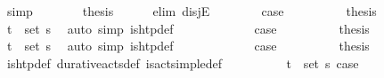 \begin{isabellebody}
\ simp\isanewline
\ \ \ \ \isamarkupfalse%
\ \isamarkupfalse%
\ {\isacharquery}{\kern0pt}thesis\isanewline
\ \ \ \ \isamarkupfalse%
\ {\isacharparenleft}{\kern0pt}elim\ disjE{\isacharparenright}{\kern0pt}\isanewline
\ \ \ \ \ \ \isamarkupfalse%
\ {\isacharquery}{\kern0pt}case{}\isanewline
\ \ \ \ \ \ \isamarkupfalse%
\ \isamarkupfalse%
\ {\isacharquery}{\kern0pt}thesis\isanewline
\ \ \ \ \ \ \ \ \isamarkupfalse%
\ {\isacartoucheopen}{\isacharparenleft}{\kern0pt}t\isactrlsub {\isasympi}{\isacharcomma}{\kern0pt}{\isasympi}{\isacharparenright}{\kern0pt}\ {\isasymin}\ set\ {\isasympi}s{\isacartoucheclose}\ \isamarkupfalse%
\ {\isacharparenleft}{\kern0pt}auto\ simp{\isacharcolon}{\kern0pt}\ is{\isacharunderscore}{\kern0pt}htp{\isacharunderscore}{\kern0pt}def{\isacharparenright}{\kern0pt}\isanewline
\ \ \ \ \isamarkupfalse%
\isanewline
\ \ \ \ \ \ \isamarkupfalse%
\ {\isacharquery}{\kern0pt}case{}\isanewline
\ \ \ \ \ \ \isamarkupfalse%
\ \isamarkupfalse%
\ {\isacharquery}{\kern0pt}thesis\isanewline
\ \ \ \ \ \ \ \ \isamarkupfalse%
\ {\isacartoucheopen}{\isacharparenleft}{\kern0pt}t\isactrlsub {\isasympi}{\isacharcomma}{\kern0pt}{\isasympi}{\isacharparenright}{\kern0pt}\ {\isasymin}\ set\ {\isasympi}s{\isacartoucheclose}\ \isamarkupfalse%
\ {\isacharparenleft}{\kern0pt}auto\ simp{\isacharcolon}{\kern0pt}\ is{\isacharunderscore}{\kern0pt}htp{\isacharunderscore}{\kern0pt}def{\isacharparenright}{\kern0pt}\isanewline
\ \ \ \ \isamarkupfalse%
\isanewline
\ \ \ \ \ \ \isamarkupfalse%
\ {\isacharquery}{\kern0pt}case{}\isanewline
\ \ \ \ \ \ \isamarkupfalse%
\ \isamarkupfalse%
\ {\isacharquery}{\kern0pt}thesis\isanewline
\ \ \ \ \ \ \ \ \isamarkupfalse%
\ is{\isacharunderscore}{\kern0pt}htp{\isacharunderscore}{\kern0pt}def\ durative{\isacharunderscore}{\kern0pt}acts{\isacharunderscore}{\kern0pt}def\ is{\isacharunderscore}{\kern0pt}act{\isacharunderscore}{\kern0pt}simple{\isacharunderscore}{\kern0pt}def\isanewline
\ \ \ \ \ \ \ \ \isamarkupfalse%
\ {\isacartoucheopen}{\isacharparenleft}{\kern0pt}t\isactrlsub {\isasympi}{\isacharcomma}{\kern0pt}{\isasympi}{\isacharparenright}{\kern0pt}\ {\isasymin}\ set\ {\isasympi}s{\isacartoucheclose}\ {\isacartoucheopen}{\isacharquery}{\kern0pt}case{}{\isacartoucheclose}\ \isamarkupfalse%

\end{isabellebody}

